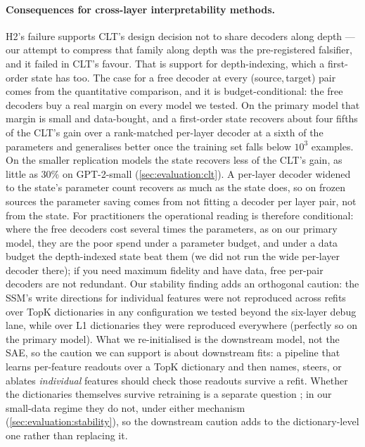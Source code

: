 \paragraph{Consequences for cross-layer interpretability methods.}
H2's failure supports CLT's design decision not to share decoders along
depth \citep{ameisen2025circuit} ---
our attempt to compress that family along depth was the pre-registered
falsifier, and it failed in CLT's favour. That is support for
depth-indexing, which a first-order state has too. The case for a free
decoder at every (source,\,target) pair comes from the quantitative
comparison, and it is budget-conditional: the free decoders buy a real
margin on every model we tested. On the primary model that margin is small
and data-bought, and a first-order state recovers about four fifths of the
CLT's gain over a rank-matched per-layer decoder at a sixth of the
parameters and generalises better once
the training set falls below $10^3$ examples. On the smaller replication
models the state recovers less of the CLT's gain, as little as 30\% on
GPT-2-small (\cref{sec:evaluation:clt}). A per-layer decoder widened to the
state's parameter count recovers as much as the state does, so on frozen
sources the parameter saving comes from not fitting a decoder per layer
pair, not from the state. For practitioners the operational
reading is therefore conditional: where the free decoders cost several times
the parameters, as on our primary model, they are the poor spend under a
parameter budget, and under a data budget the depth-indexed state beat them
(we did not run the wide per-layer decoder there); if you need maximum
fidelity and
have data, free per-pair decoders are not redundant. Our stability finding
adds an orthogonal
caution: the SSM's write directions for individual features were not
reproduced across refits over TopK dictionaries in any configuration we
tested beyond the six-layer debug lane, while over L1
dictionaries they were reproduced everywhere (perfectly so on the primary
model). What we re-initialised is the downstream model, not the SAE, so the
caution we can support is about downstream fits: a pipeline that learns
per-feature readouts over a TopK dictionary and then names, steers, or
ablates \emph{individual} features should check those readouts survive a
refit. Whether the dictionaries themselves survive retraining is a separate
question \citep{paulo2026seeds,song2026consistency}; in our small-data
regime they do not, under either mechanism (\cref{sec:evaluation:stability}),
so the downstream caution adds to the dictionary-level one rather than
replacing it.

